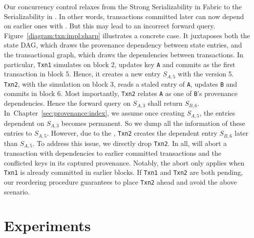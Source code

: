 Our concurrency control relaxes from the Strong Serializability in Fabric to the Serializability in {\fs}.
In other words, transactions committed later can now depend on earlier ones with . 
But this may lead to an incorrect forward query. 
Figure~\ref{diagram:txn:impl:sharp} illustrates a concrete case.
It juxtaposes both the state DAG, which draws the provenance dependency between state entries, and the transactional graph, which draws the dependencies between transactions. 
In particular, \texttt{Txn1} simulates on block 2, updates key \texttt{A} and commits as the first transaction in block 5. Hence, it creates a new entry $S_{A,5}$ with the version 5.
\texttt{Txn2}, with the simulation on block 3, reads a staled entry of \texttt{A}, updates \texttt{B} and commits in block 6. 
Most importantly, \texttt{Txn2} relates \texttt{A} as one of \texttt{B}'s provenance dependencies. 
Hence the forward query on $S_{A,3}$ shall return $S_{B,6}$. 
In~Chapter~\ref{sec:provenance:index}, we assume once creating $S_{A,5}$, the entries dependent on $S_{A,3}$ becomes permanent. So we dump all the information of these entries to $S_{A,5}$. 
However, due to the , \texttt{Txn2} creates the dependent entry $S_{B,6}$ later than $S_{A,5}$.
To address this issue, we directly drop \texttt{Txn2}. 
In all, {\fs} will abort a transaction with  dependencies to earlier committed transactions and the conflicted keys in its captured provenance. 
Notably, the abort only applies when \texttt{Txn1} is already committed in earlier blocks. 
If \texttt{Txn1} and \texttt{Txn2} are both pending, our reordering procedure guarantees to place \texttt{Txn2} ahead and avoid the above scenario. 

\section{Experiments}
\label{sec:txn:exp}
